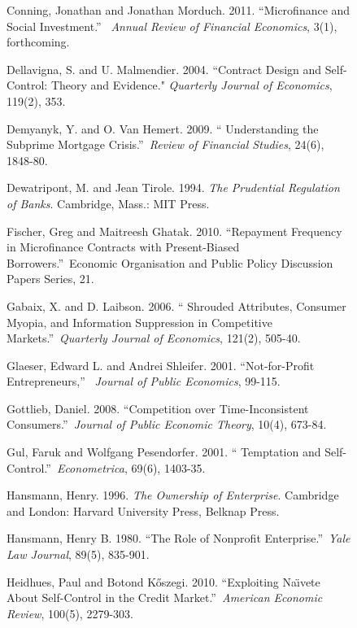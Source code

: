 \documentclass[11pt]{article}%
\begin{document}
\begin{figure}
{\begin{thebibliography}{99}
Conning, Jonathan and Jonathan Morduch. 2011.
\textquotedblleft Microfinance and Social Investment.\textquotedblright%
\ \textit{Annual Review of Financial Economics}, 3(1), forthcoming.

\bibitem {}Dellavigna, S. and U. Malmendier. 2004. \textquotedblleft Contract
Design and Self-Control: Theory and Evidence." \textit{Quarterly Journal of
Economics}, 119(2), 353.

\bibitem {}Demyanyk, Y. and O. Van Hemert. 2009. \textquotedblleft
Understanding the Subprime Mortgage Crisis.\textquotedblright\ \textit{Review
of Financial Studies}, 24(6), 1848-80.

Dewatripont, M. and Jean Tirole. 1994. \textit{The
Prudential Regulation of Banks}. Cambridge, Mass.: MIT Press.

Fischer, Greg and Maitreesh Ghatak. 2010.
\textquotedblleft Repayment Frequency in Microfinance Contracts with
Present-Biased Borrowers.\textquotedblright\ Economic Organisation and Public
Policy Discussion Papers Series, 21.

Gabaix, X. and D. Laibson. 2006. \textquotedblleft
Shrouded Attributes, Consumer Myopia, and Information Suppression in
Competitive Markets.\textquotedblright\ \textit{Quarterly Journal of
Economics}, 121(2), 505-40.

Glaeser, Edward L. and Andrei Shleifer. 2001.
\textquotedblleft Not-for-Profit Entrepreneurs,\textquotedblright%
\ \textit{Journal of Public Economics}, 99-115.

Gottlieb, Daniel. 2008. \textquotedblleft Competition
over Time-Inconsistent Consumers.\textquotedblright\ \textit{Journal of Public
Economic Theory}, 10(4), 673-84.

\bibitem {}Gul, Faruk and Wolfgang Pesendorfer. 2001. \textquotedblleft
Temptation and Self-Control.\textquotedblright\ \textit{Econometrica}, 69(6), 1403-35.

\bibitem {}Hansmann, Henry. 1996. \emph{The Ownership of Enterprise}.
Cambridge and London: Harvard University Press, Belknap Press.

\bibitem {}Hansmann, Henry B. 1980. \textquotedblleft The Role of Nonprofit
Enterprise.\textquotedblright\ \textit{Yale Law Journal}, 89(5), 835-901.

Heidhues, Paul and Botond K\H{o}szegi. 2010.
\textquotedblleft Exploiting Na\"{\i}vete About Self-Control in the Credit
Market.\textquotedblright\ \textit{American Economic Review}, 100(5), 2279-303.


\end{thebibliography}}
\end{figure}
\end{document}
